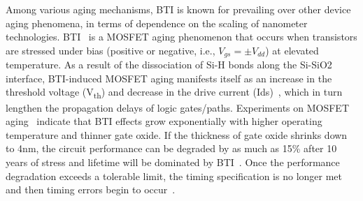 Among various aging mechanisms, BTI is known for prevailing over other device aging phenomena, in terms of dependence on the scaling of nanometer technologies. BTI~\cite{schroder2003negative} is a MOSFET aging phenomenon that occurs when transistors are stressed under bias (positive or negative, i.e., $V_{gs} = \pm V_{dd}$) at elevated temperature. As a result of the dissociation of Si-H bonds along the Si-SiO2 interface, BTI-induced MOSFET aging manifests itself as an increase in the threshold voltage (V\textsubscript{th}) and decrease in the drive current (Ids)~\cite{zafar2006negative}, which in turn lengthen the propagation delays of logic gates/paths. Experiments on MOSFET aging~\cite{chakravarthi2004comprehensive} indicate that BTI effects grow exponentially with higher operating temperature and thinner gate oxide. If the thickness of gate oxide shrinks down to 4nm, the circuit performance can be degraded by as much as 15\% after 10 years of stress and lifetime will be dominated by BTI~\cite{kimizuka1999impact}. Once the performance degradation exceeds a tolerable limit, the timing specification is no longer met and then timing errors begin to occur~\cite{kumar2006analytical}\cite{wang2010impact}.

